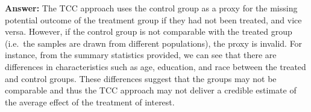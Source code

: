 \documentclass[
]{article}
\begin{document}
\begin{enumerate}
\begin{enumerate}
    \textbf{Answer:} The TCC approach uses the control group as a proxy
    for the missing potential outcome of the treatment group if they had
    not been treated, and vice versa. However, if the control group is
    not comparable with the treated group (i.e.~the samples are drawn
    from different populations), the proxy is invalid. For instance,
    from the summary statistics provided, we can see that there are
    differences in characteristics such as age, education, and race
    between the treated and control groups. These differences suggest
    that the groups may not be comparable and thus the TCC approach may
    not deliver a credible estimate of the average effect of the
    treatment of interest.
  \end{enumerate}
\end{enumerate}

\pagebreak
\end{document}
